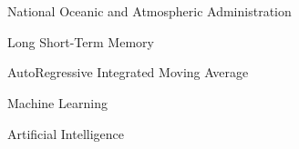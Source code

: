 \documentclass[12pt,a4paper,openany]{scrbook}
\begin{document}
 




\newpage






\tableofcontents

\clearpage




\listoffigures

\clearpage




\listoftables

\clearpage

 

 

\chapter*{}




\begin{description}[align=left]

	\item[NOAA] National Oceanic and Atmospheric Administration

	\item[LSTM] Long Short-Term Memory

	\item[ARIMA] AutoRegressive Integrated Moving Average

	\item[ML] Machine Learning

	\item[AI] Artificial Intelligence

\end{description}



\clearpage






\end{document}
